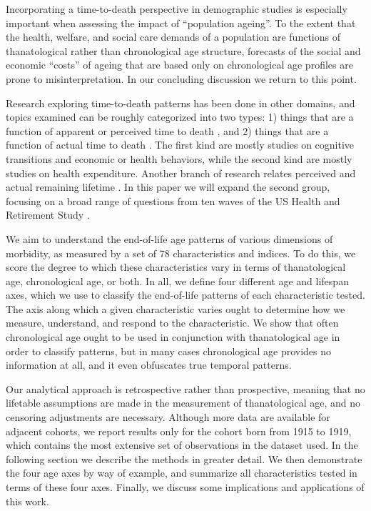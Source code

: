 \documentclass[11pt,oneside]{article} %
\begin{document}
Incorporating a time-to-death perspective in demographic studies is especially
important when assessing the impact of ``population ageing''.
To the extent that the health, welfare, and social care demands of a
population are functions of thanatological rather than chronological age
structure, forecasts of the social and economic ``costs'' of ageing that are
based only on chronological age profiles are prone to misinterpretation.
In our concluding discussion we return to this point.

Research exploring time-to-death patterns has been done in other
domains, and topics examined can be roughly categorized into two types: 1) things that are a
function of apparent or perceived time to death
\citep{hamermesh1985expectations,hurd1995evaluation,carstensen2006influence,gan2004subjective,biro2010subjective,salm2010subjective,van2010living,cocco2012longevity,payne2013life,balia2013survival},
and 2) things that are a function of actual time to death
\citep{miller2001increasing,seshamani2004longitudinal,werblow2007population}.
The first kind are mostly studies on cognitive transitions and economic or
health behaviors, while the second kind are mostly studies on health
expenditure.
Another branch of research relates perceived and actual remaining lifetime
\citep{perozek2008using,delavande2011differential,post2012longevity,kutlu2013individuals}.
In this paper we will expand the second group, focusing on a broad range of
questions from ten waves of the US Health and Retirement Study \citep{HRS}.

We aim to understand the end-of-life age patterns of various dimensions of
morbidity, as measured by a set of 78 characteristics and indices. To do this,
we score the degree to which these characteristics vary in terms of thanatological
age, chronological age, or both. In all, we define four different age and
lifespan axes, which we use to classify the end-of-life patterns of each
characteristic tested. The axis along which a given characteristic varies ought
to determine how we measure, understand, and respond to the characteristic. We show that often chronological age ought to be used in conjunction with
thanatological age in order to classify patterns, but in many cases
chronological age provides no information at all, and it even obfuscates true temporal
patterns.

Our analytical approach is retrospective rather than
prospective, meaning that no lifetable assumptions are made in the measurement
of thanatological age, and no censoring adjustments are necessary. Although more
data are available for adjacent cohorts, we report results only for the cohort
born from 1915 to 1919, which contains the most extensive set of observations in
the dataset used. In the following section we describe the methods in
greater detail. We then demonstrate the four age axes by way of example,
and summarize all characteristics tested in terms of these four axes. Finally,
we discuss some implications and applications of this work.
\end{document}
